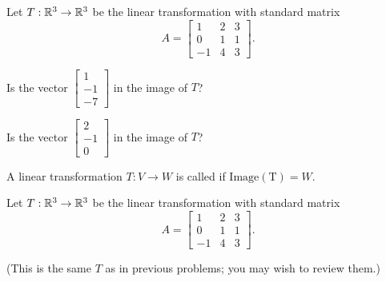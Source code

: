 
\edXsolution{
}

\endedxproblem



Let $T: \mathbb R^3 \rightarrow \mathbb R^3$ be the linear transformation with standard matrix 
\[ A = \left[\begin{array}{ccc} 1 & 2 & 3 \\ 0 & 1 & 1 \\ -1 & 4 & 3  \end{array} \right]. \]

Is the vector $\left[\begin{array}{c} 1 \\ -1  \\ -7 \end{array} \right]$ in the image of $T$?



Is the vector $\left[\begin{array}{c} 2 \\ -1  \\ 0 \end{array} \right]$ in the image of $T$?



\edXsolution{ 

}
\endedxproblem


\endedxvertical






{}  
A linear transformation $T: V\rightarrow W$ is called  {} if $ \mathrm{Image(T)}  = W$.  


\endedxtext




Let $T: \mathbb R^3 \rightarrow \mathbb R^3$ be the linear transformation with standard matrix 
\[ A = \left[\begin{array}{ccc} 1 & 2 & 3 \\ 0 & 1 & 1 \\ -1 & 4 & 3  \end{array} \right]. \]

(This is the same $T$ as in previous problems; you may wish to review them.)  

